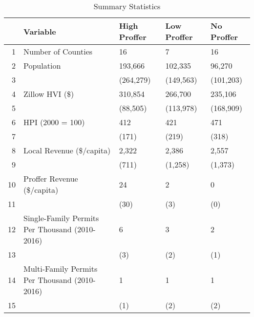 \begin{table}[ht]
\centering
\begin{tabular}{rllll}
  \hline
 & Variable & High Proffer & Low Proffer & No Proffer \\ 
  \hline
1 & Number of Counties & 16 & 7 & 16 \\ 
  2 & Population & 193,666 & 102,335 & 96,270 \\ 
  3 &  & (264,279) & (149,563) & (101,203) \\ 
  4 & Zillow HVI (\$) & 310,854 & 266,700 & 235,106 \\ 
  5 &  & (88,505) & (113,978) & (168,909) \\ 
  6 & HPI (2000 = 100) & 412 & 421 & 471 \\ 
  7 &  & (171) & (219) & (318) \\ 
  8 & Local Revenue (\$/capita) & 2,322 & 2,386 & 2,557 \\ 
  9 &  & (711) & (1,258) & (1,373) \\ 
  10 & Proffer Revenue (\$/capita) & 24 & 2 & 0 \\ 
  11 &  & (30) & (3) & (0) \\ 
  12 & Single-Family Permits Per Thousand (2010-2016) & 6 & 3 & 2 \\ 
  13 &  & (3) & (2) & (1) \\ 
  14 & Multi-Family Permits Per Thousand (2010-2016) & 1 & 1 & 1 \\ 
  15 &  & (1) & (2) & (2) \\ 
   \hline
\end{tabular}
\caption{Summary Statistics} 
\end{table}
